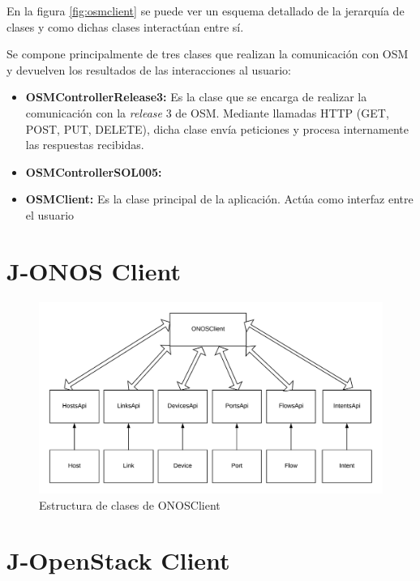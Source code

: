En la figura \ref{fig:osmclient} se puede ver un esquema detallado de la jerarquía de clases y como dichas clases interactúan entre sí.

Se compone principalmente de tres clases que realizan la comunicación con OSM y devuelven los resultados de las interacciones al usuario:

\begin{itemize}
	\item \textbf{OSMControllerRelease3:} Es la clase que se encarga de realizar la comunicación con la \textit{release} 3 de OSM. Mediante llamadas HTTP (GET, POST, PUT, DELETE), dicha clase envía peticiones y procesa internamente las respuestas recibidas.
	\item \textbf{OSMControllerSOL005:} 
	\item \textbf{OSMClient:} Es la clase principal de la aplicación. Actúa como interfaz entre el usuario 
\end{itemize}


\section{J-ONOS Client}
\label{sec:onosclient}

\begin{figure}[!ht]
	\centering
	\includegraphics[width=0.8\linewidth]{imagenes/ONOSClient}
	\caption{Estructura de clases de ONOSClient}
	\label{fig:onosclient}
\end{figure}


\section{J-OpenStack Client}
\label{sec:openstackclient}

